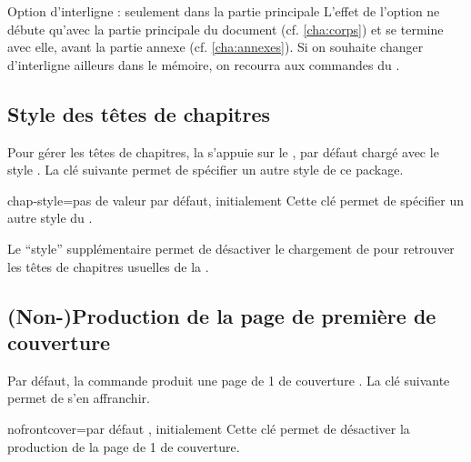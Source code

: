 \begin{dbwarning}{Option d'interligne : seulement dans la partie
    principale}{}
  L'effet de l'option  ne débute qu'avec la partie principale du
  document (cf. \vref{cha:corps}) et se termine avec elle, avant la partie
  annexe (cf. \vref{cha:annexes}). Si on souhaite changer d'interligne ailleurs
  dans le mémoire, on recourra aux commandes du 
  .
\end{dbwarning}

\subsection{Style des têtes de chapitres}\label{sec:style-des-tetes}

Pour gérer les têtes de chapitres, la \yatcl{} s'appuie sur le
, par défaut chargé avec le style . La
clé  suivante permet de spécifier un autre style de ce
package.
%
{%
  \begin{docKey}{chap-style}{=\textbar{}\textbar{}\textbar{}\textbar{}\textbar{}\textbar{}\textbar{}\textbar{}}{pas
      de valeur par défaut, initialement }
    Cette clé permet de spécifier un autre style du .

    Le \enquote{style} supplémentaire  permet de désactiver le
    chargement de  pour retrouver les têtes de chapitres
    usuelles de la .
  \end{docKey}
}

\subsection{(Non-)Production de la page de première de
  couverture}\label{sec:non-production-de}

Par défaut, la commande  produit une page de 1\iere{} de
couverture . La clé
 suivante permet de s'en affranchir.

\begin{docKey}{nofrontcover}{=\textbar{}}{par défaut
    , initialement }
  Cette clé permet de désactiver la production de la page de 1\iere{} de
  couverture.
\end{docKey}

